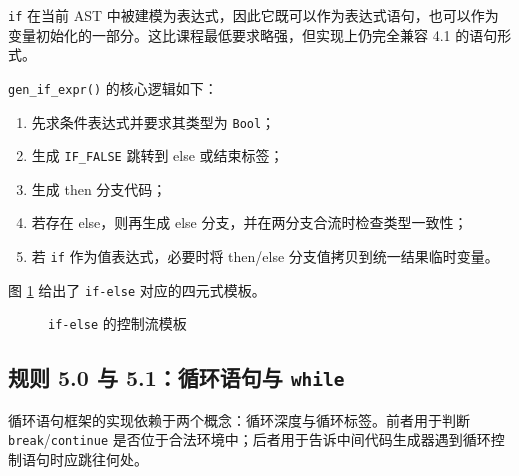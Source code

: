\documentclass[UTF8,a4paper,12pt]{ctexart}
\newcommand{\pkg}[1]{\texttt{#1}}
\newcommand{\op}[1]{\texttt{#1}}
\begin{document}
\pkg{if} 在当前 AST 中被建模为表达式，因此它既可以作为表达式语句，也可以作为变量初始化的一部分。这比课程最低要求略强，但实现上仍完全兼容 4.1 的语句形式。

\pkg{gen\_if\_expr()} 的核心逻辑如下：

\begin{enumerate}[label=\arabic*.]
    \item 先求条件表达式并要求其类型为 \pkg{Bool}；
    \item 生成 \op{IF\_FALSE} 跳转到 else 或结束标签；
    \item 生成 then 分支代码；
    \item 若存在 else，则再生成 else 分支，并在两分支合流时检查类型一致性；
    \item 若 \pkg{if} 作为值表达式，必要时将 then/else 分支值拷贝到统一结果临时变量。
\end{enumerate}

图 \ref{fig:if-template} 给出了 \pkg{if-else} 对应的四元式模板。

\begin{figure}[H]
    \centering
    \caption{\pkg{if-else} 的控制流模板}
    \label{fig:if-template}
\end{figure}

\subsection{规则 5.0 与 5.1：循环语句与 \pkg{while}}

循环语句框架的实现依赖于两个概念：循环深度与循环标签。前者用于判断 \pkg{break}/\pkg{continue} 是否位于合法环境中；后者用于告诉中间代码生成器遇到循环控制语句时应跳往何处。
\end{document}
